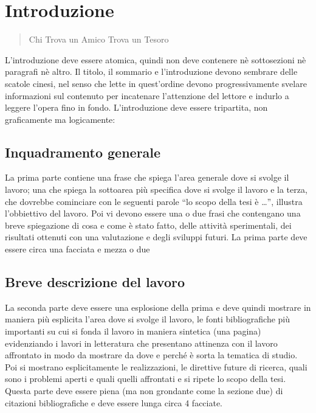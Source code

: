 \chapter{Introduzione}
\label{Introduzione}
\thispagestyle{empty}

\begin{quotation}
{\footnotesize
{}
\begin{flushright}
Chi Trova un Amico Trova un Tesoro
\end{flushright}
}
\end{quotation}
\vspace{0.5cm}

\noindent L'introduzione deve essere atomica, quindi non deve contenere n\`e sottosezioni n\`e paragrafi n\`e altro. Il titolo, il sommario e l'introduzione devono sembrare delle scatole cinesi, nel senso che lette in quest'ordine devono progressivamente svelare informazioni sul contenuto per incatenare l'attenzione del lettore e indurlo a leggere l'opera fino in fondo. L'introduzione deve essere tripartita, non graficamente ma logicamente:

\section{Inquadramento generale}
La prima parte contiene una frase che spiega l'area generale dove si svolge il lavoro; una che spiega la sottoarea pi\`u specifica dove si svolge il lavoro e la terza, che dovrebbe cominciare con le seguenti parole ``lo scopo della tesi \`e \dots'', illustra l'obbiettivo del lavoro. Poi vi devono essere una o due frasi che contengano una breve spiegazione di cosa e come \`e stato fatto, delle attività sperimentali, dei risultati ottenuti con una valutazione e degli sviluppi futuri. La prima parte deve essere circa una facciata e mezza o due

\section{Breve descrizione del lavoro}
La seconda parte deve essere una esplosione della prima e deve quindi mostrare in maniera pi\`u esplicita l'area dove si svolge il lavoro, le fonti bibliografiche pi\`u importanti su cui si fonda il lavoro in maniera sintetica (una pagina) evidenziando i lavori in letteratura che presentano attinenza con il lavoro affrontato in modo da mostrare da dove e perch\'e \`e sorta la tematica di studio. Poi si mostrano esplicitamente le realizzazioni, le direttive future di ricerca, quali sono i problemi aperti e quali quelli affrontati e si ripete lo scopo della tesi. Questa parte deve essere piena (ma non grondante come la sezione due) di citazioni bibliografiche e deve essere lunga circa 4 facciate.


